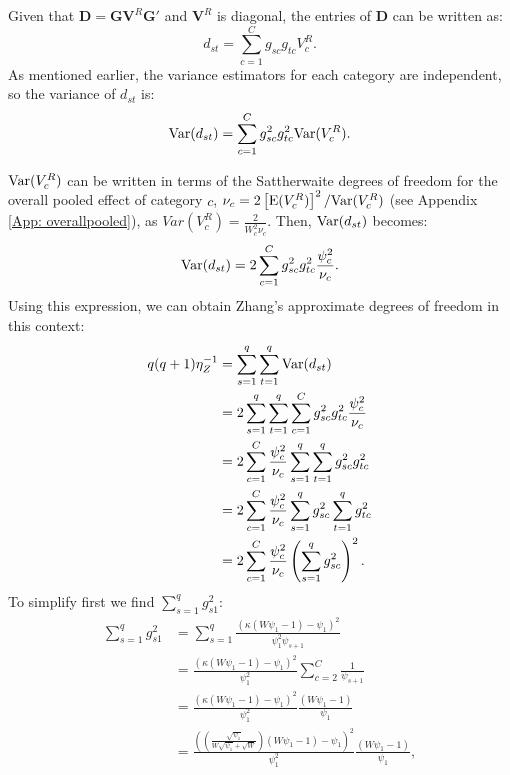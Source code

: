 Given that $\bm{D} = \bm{G} \bm{V}^R \bm{G}'$ and $\bm{V}^R$ is diagonal, the entries of $\bm{D}$ can be written as:
\begin{equation}
    d_{st} = \sum_{c=1}^C g_{sc} g_{tc} V^R_c.
    \nonumber
\end{equation}
As mentioned earlier, the variance estimators for each category are independent, so the variance of $d_{st}$ is:
\begin{equation}
    {\text{Var}}(d_{st}) = \sum_{c=1}^C g_{sc}^2 g_{tc}^2 {\text{Var}}(V^R_c).
    \nonumber
\end{equation}

${\text{Var}}(V^R_c)$ can be written in terms of the Sattherwaite degrees of freedom for the overall pooled effect of category $c$, $\nu_c = 2\left[{\text{E}}(V^R_c)\right]^2 / {\text{Var}}(V^R_c)$ (see Appendix \ref{App: overallpooled}), as $Var(V_c^R) = \frac{2}{W^2_c\nu_c}$. Then, ${\text{Var}}(d_{st})$ becomes: 
\begin{equation}
    {\text{Var}}(d_{st}) = 2 \sum_{c=1}^C g_{sc}^2 g_{tc}^2 \frac{\psi_c^2}{\nu_c}.
    \nonumber
\end{equation}
Using this expression, we can obtain Zhang's approximate degrees of freedom in this context:
\begin{equation}
    \begin{aligned}
q(q + 1)\eta_Z^{-1} &= \sum_{s=1}^q \sum_{t = 1}^q {\text{Var}}(d_{st}) \\ 
&= 2\sum_{s=1}^q \sum_{t = 1}^q \sum_{c=1}^C g_{sc}^2 g_{tc}^2 \frac{\psi_c^2}{\nu_c} \\
&= 2 \sum_{c=1}^C \frac{\psi_c^2}{\nu_c} \sum_{s=1}^q \sum_{t=1}^q g_{sc}^2 g_{tc}^2 \\
&= 2 \sum_{c=1}^C \frac{\psi_c^2}{\nu_c} \sum_{s=1}^q g_{sc}^2 \sum_{t=1}^q g_{tc}^2 \\
&= 2\sum_{c=1}^C \frac{\psi_c^2}{\nu_c} \left(\sum_{s=1}^q g_{sc}^2\right)^2.
\end{aligned}
\nonumber
\end{equation}
To simplify first we find $\sum_{s=1}^q g_{s1}^2$:
\begin{equation}
    \begin{aligned}
\sum_{s=1}^q g_{s1}^2 &= \sum_{s=1}^q \frac{\left(\kappa(W \psi_1 - 1) - \psi_1\right)^2}{\psi_1^2 \psi_{s+1}} \\
&= \frac{\left(\kappa(W \psi_1 - 1) - \psi_1\right)^2}{\psi_1^2} \sum_{c=2}^C \frac{1}{\psi_{s+1}} \\
&= \frac{\left(\kappa(W \psi_1 - 1) - \psi_1\right)^2}{\psi_1^2} \frac{(W \psi_1 - 1)}{\psi_1} \\
&= \frac{\left(\left( \frac{\sqrt{\psi_1}}{W \sqrt{\psi_1} + \sqrt{W}}\right)(W \psi_1 - 1) - \psi_1\right)^2}{\psi_1^2} \frac{(W \psi_1 - 1)}{\psi_1}, \\
\end{aligned}
\nonumber
\end{equation}


